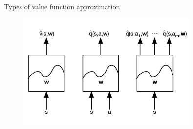 \bgroup
\begin{frame}{Types of value function approximation}
\begin{figure}
\centering
\includegraphics[width=0.8\textwidth]{img/vfa_types.pdf}
\end{figure}
\end{frame}
\egroup